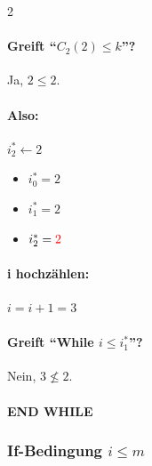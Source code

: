 \begin{multicols}{2}
    \paragraph{Greift ``$C_2(2)\le k$''?} Ja, $2 \le 2$.
    \paragraph{Also:} $i_2^\ast \gets 2$
    \columnbreak
    \begin{itemize}
        \item $i_0^\ast = 2$
        \item $i_1^\ast = 2 $
        \item $i_2^\ast = \textcolor{red}{2}$
    \end{itemize}
\end{multicols}

\paragraph{i hochzählen:} $i = i + 1 = 3$

\paragraph{Greift ``While $i \le i_{1}^\ast$''?} Nein, $3 \not\le 2$.

\paragraph{END WHILE}

\subsubsection*{If-Bedingung $i\le m$}

